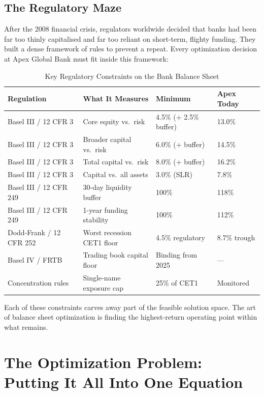 \documentclass[12pt,a4paper]{article}
\begin{document}
\subsection{The Regulatory Maze}

After the 2008 financial crisis, regulators worldwide decided that banks had
been far too thinly capitalised and far too reliant on short-term, flighty
funding.  They built a dense framework of rules to prevent a repeat.  Every
optimization decision at Apex Global Bank must fit inside this framework:

\begin{table}[H]
  \centering
  \caption{Key Regulatory Constraints on the Bank Balance Sheet}
  \begin{tabular}{llll}
    \toprule
    Regulation & What It Measures & Minimum & Apex Today \\
    \midrule
    Basel III / 12 CFR 3 & Core equity vs.\ risk & 4.5\% (+ 2.5\% buffer) & 13.0\% \\
    Basel III / 12 CFR 3 & Broader capital vs.\ risk & 6.0\% (+ buffer) & 14.5\% \\
    Basel III / 12 CFR 3 & Total capital vs.\ risk & 8.0\% (+ buffer) & 16.2\% \\
    Basel III / 12 CFR 3 & Capital vs.\ all assets & 3.0\% (SLR) & 7.8\% \\
    Basel III / 12 CFR 249 & 30-day liquidity buffer & 100\% & 118\% \\
    Basel III / 12 CFR 249 & 1-year funding stability & 100\% & 112\% \\
    Dodd-Frank / 12 CFR 252 & Worst recession CET1 floor & 4.5\% regulatory & 8.7\% trough \\
    Basel IV / FRTB & Trading book capital floor & Binding from 2025 & --- \\
    Concentration rules & Single-name exposure cap & 25\% of CET1 & Monitored \\
    \bottomrule
  \end{tabular}
\end{table}

Each of these constraints carves away part of the feasible solution space.
The art of balance sheet optimization is finding the highest-return operating
point within what remains.

\section{The Optimization Problem: Putting It All Into One Equation}
\end{document}
